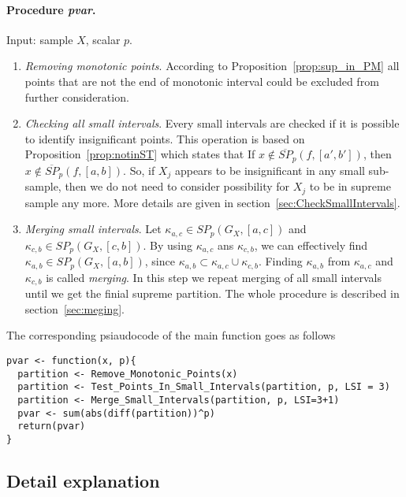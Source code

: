 \documentclass[12pt, a4paper]{article}
\numberwithin{equation}{section}
\begin{document}
\paragraph{Procedure \emph{pvar}.}
Input: sample $X$, scalar $p$.

\begin{enumerate}
  \item \emph{Removing monotonic points}. According to 
  Proposition~\ref{prop:sup_in_PM}
  all points that are not the end of 
  monotonic interval could be excluded 
  from further consideration. 
  
  \item \emph{Checking all small intervals}. Every small intervals are
    checked if it is possible to 
    identify insignificant points. 
    This operation is based on 
    Proposition~\ref{prop:notinST} which states that 
    If $x \notin \overline{SP}_p(f, [a', b'])$, then 
    $x \notin \overline{SP}_p(f, [a, b])$.
    So, if $X_j$ appears to be insignificant in
    any small sub-sample, then
    we do not need to consider possibility for
    $X_j$ to be in supreme sample any more. 
    More details are given in section~\ref{sec:CheckSmallIntervals}.  
 
  \item \emph{Merging small intervals}.  
   Let $\kappa_{a,c} \in SP_p(G_X, [a,c])$ and
   $\kappa_{c,b} \in SP_p(G_X, [c, b])$. By using $\kappa_{a,c}$
   ans $\kappa_{c,b}$, we can effectively
   find $\kappa_{a,b} \in SP_p(G_X, [a, b])$, since
   $\kappa_{a,b} \subset \kappa_{a,c} \cup \kappa_{c,b}$. 
   Finding
   $\kappa_{a,b}$ from $\kappa_{a,c}$ and $\kappa_{c,b}$ 
   is called \emph{merging}.
   In this step we repeat merging of all small intervals until
   we get the finial supreme partition.
   The whole procedure is described in section~\ref{sec:meging}.  
  
\end{enumerate}

The corresponding psiaudocode of the main function goes as follows
\begin{lstlisting}
pvar <- function(x, p){
  partition <- Remove_Monotonic_Points(x) 
  partition <- Test_Points_In_Small_Intervals(partition, p, LSI = 3) 
  partition <- Merge_Small_Intervals(partition, p, LSI=3+1)
  pvar <- sum(abs(diff(partition))^p)  
  return(pvar)
}
\end{lstlisting}
  
\subsection{Detail explanation}
\label{sec:DetailExplanation}
\end{document}
